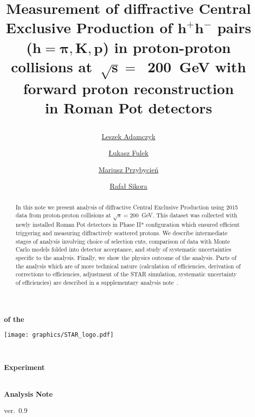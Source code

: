 \documentclass[a4paper,10pt,notitlepage]{report}
\title{%
\centering\hspace*{-0.08\linewidth}\begin{minipage}{1.16\linewidth}\centering%
\textbf{Measurement of diffractive Central Exclusive Production of $\bm{h^{+}h^{-}}$ pairs ($\bm{h=\pi,K,p}$) in proton-proton collisions at~$\bm{\sqrt{s}=}$~200~GeV with forward proton reconstruction\\in Roman Pot detectors}
\end{minipage}%
\vspace*{10pt}}
\author[ ]{\href{mailto:leszek.adamczyk@agh.edu.pl}{Leszek Adamczyk}}
\author[ ]{\href{mailto:lukasz.fulek@fis.agh.edu.pl}{Łukasz Fulek}}
\author[ ]{\href{mailto:mariusz.przybycien@agh.edu.pl}{Mariusz Przybycień}}
\author[ ]{\href{mailto:rafal.sikora@fis.agh.edu.pl}{Rafał Sikora}}
\affil[ ]{AGH University of Science and Technology, FPACS, Kraków, Poland}
\begin{document}
\begin{center}
\begin{minipage}[c]{0.12\linewidth}%
\vspace{5.5pt}\textbf{\LARGE{of the}}
\end{minipage}
\begin{minipage}[c]{0.15\linewidth}%
\hspace*{-8pt}\texttt{[image: graphics/STAR\_logo.pdf]}
\end{minipage}~
\begin{minipage}[c]{0.24\linewidth}%
\vspace{9pt}\hspace*{-8pt}\textbf{\LARGE{Experiment}}
\end{minipage}\\[-50pt]
\textbf{\LARGE{Analysis Note}}

\vspace*{150pt}
\begin{minipage}{\linewidth}
\maketitle
\begin{abstract}
In this note we present analysis of diffractive Central Exclusive Production using 2015 data from proton-proton collisions at $\sqrt{s}=200$~GeV. This dataset was collected with newly installed Roman Pot detectors in Phase II* configuration which ensured efficient triggering and measuring diffractively scattered protons. We describe intermediate stages of analysis involving choice of selection cuts, comparison of data with Monte Carlo models folded into detector acceptance, and study of systematic uncertainties specific to the analysis. Finally, we show the physics outcome of the analysis. Parts of the analysis which are of more technical nature (calculation of efficiencies, derivation of corrections to efficiencies, adjustment of the STAR simulation, systematic uncertainty of efficiencies) are described in a supplementary analysis note~\cite{supplementaryNote}.
\end{abstract}
\thispagestyle{empty}
\end{minipage}

\vspace{50pt}

ver.~0.9
\end{center}


\clearpage
\thispagestyle{empty}
\end{document}
